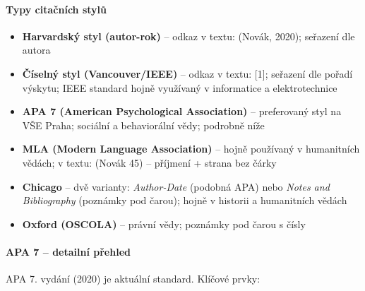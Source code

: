 \paragraph{Typy citačních stylů}
\begin{itemize}
  \item \textbf{Harvardský styl (autor-rok)} -- odkaz v textu: (Novák, 2020); seřazení dle autora
  \item \textbf{Číselný styl (Vancouver/IEEE)} -- odkaz v textu: [1]; seřazení dle pořadí výskytu;
    IEEE standard hojně využívaný v informatice a elektrotechnice
  \item \textbf{APA 7 (American Psychological Association)} -- preferovaný styl na VŠE Praha;
    sociální a behaviorální vědy; podrobně níže
  \item \textbf{MLA (Modern Language Association)} -- hojně používaný v humanitních vědách;
    v textu: (Novák 45) -- příjmení + strana bez čárky
  \item \textbf{Chicago} -- dvě varianty: \textit{Author-Date} (podobná APA) nebo \textit{Notes and Bibliography}
    (poznámky pod čarou); hojně v historii a humanitních vědách
  \item \textbf{Oxford (OSCOLA)} -- právní vědy; poznámky pod čarou s čísly
\end{itemize}

\paragraph{APA 7 -- detailní přehled}

APA 7. vydání (2020) je aktuální standard. Klíčové prvky:

